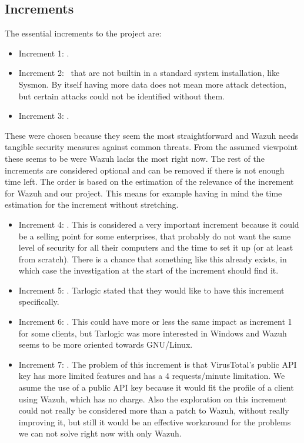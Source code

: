\subsection{Increments} \label{increments}
The essential increments to the project are:
\begin{itemize}
	\item Increment 1: \IncrementoUno.
	\item Increment 2: \IncrementoDos \ that are not builtin in a standard system installation, like Sysmon. By itself having more data does not mean more attack detection, but certain attacks could not be identified without them.
	\item Increment 3: \IncrementoTres.
\end{itemize}
\linej
These were chosen because they seem the most straightforward and Wazuh needs tangible security measures against common threats. From the assumed viewpoint these seems to be were Wazuh lacks the most right now.
\linej
\linej
The rest of the increments are considered optional and can be removed if there is not enough time left. The order is based on the estimation of the relevance of the increment for Wazuh and our project. This means for example having in mind the time estimation for the increment without stretching.
\begin{itemize}
	\item Increment 4: \IncrementoCuatro. This is considered a very important increment because it could be a selling point for some enterprises, that probably do not want the same level of security for all their computers and the time to set it up (or at least from scratch). There is a chance that something like this already exists, in which case the investigation at the start of the increment should find it.
	\item Increment 5: \IncrementoCinco. Tarlogic stated that they would like to have this increment specifically.
	\item Increment 6: \IncrementoSeis. This could have more or less the same impact as increment 1 for some clients, but Tarlogic was more interested in Windows and Wazuh seems to be more oriented towards GNU/Linux.
	\item Increment 7: \IncrementoSiete. The problem of this increment is that VirusTotal's public API key has more limited features and has a 4 requests/minute limitation\cite{virustotal_faq}. We asume the use of a public API key because it would fit the profile of a client using Wazuh, which has no charge. Also the exploration on this increment could not really be considered more than a patch to Wazuh, without really improving it, but still it would be an effective workaround for the problems we can not solve right now with only Wazuh.
\end{itemize}

